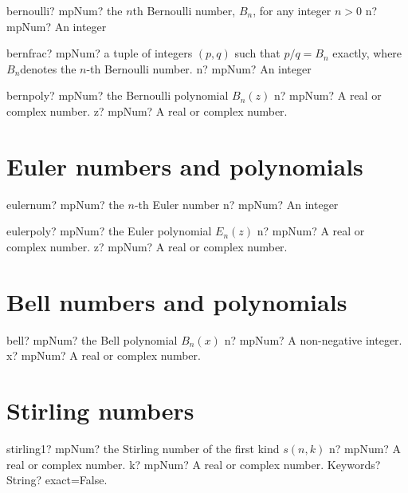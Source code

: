 \documentclass[12pt,a4paper,openany]{book}
\begin{document}
\begin{mpFunctionsExtract}
\mpFunctionOne
{bernoulli? mpNum? the $n$th Bernoulli number, $B_n$, for any integer $n>0$}
{n? mpNum? An integer}
\end{mpFunctionsExtract}

\begin{mpFunctionsExtract}
\mpFunctionOne
{bernfrac? mpNum? a tuple of integers $(p,q)$ such that $p/q=B_n$ exactly, where $B_n$denotes the $n$-th Bernoulli number.}
{n? mpNum? An integer}
\end{mpFunctionsExtract}

\begin{mpFunctionsExtract}
\mpFunctionTwo
{bernpoly? mpNum? the Bernoulli polynomial $B_n(z)$}
{n? mpNum? A real or complex number.}
{z? mpNum? A real or complex number.}
\end{mpFunctionsExtract}

\section{Euler numbers and polynomials}

\begin{mpFunctionsExtract}
\mpFunctionOne
{eulernum? mpNum? the $n$-th Euler number}
{n? mpNum? An integer}
\end{mpFunctionsExtract}

\begin{mpFunctionsExtract}
\mpFunctionTwo
{eulerpoly? mpNum? the Euler polynomial $E_n(z)$}
{n? mpNum? A real or complex number.}
{z? mpNum? A real or complex number.}
\end{mpFunctionsExtract}

\section{Bell numbers and polynomials}

\begin{mpFunctionsExtract}
\mpFunctionTwo
{bell? mpNum? the Bell polynomial $B_n(x)$}
{n? mpNum? A non-negative integer.}
{x? mpNum? A real or complex number.}
\end{mpFunctionsExtract}

\section{Stirling numbers}

\begin{mpFunctionsExtract}
\mpFunctionThree
{stirling1? mpNum? the Stirling number of the first kind $s(n,k)$}
{n? mpNum? A real or complex number.}
{k? mpNum? A real or complex number.}
{Keywords? String? exact=False.}
\end{mpFunctionsExtract}
\end{document}
